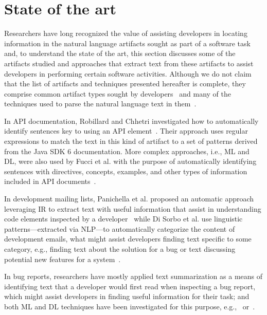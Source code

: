 \section{State of the art}
\label{cp1:novelty}


Researchers have long recognized the value of 
assisting developers in locating information in the natural language artifacts sought as part of a software task
and, to understand the state of the art, this section discusses 
some of the artifacts studied and approaches 
that extract text from these artifacts
to assist developers in performing certain 
software activities.
Although we do not claim that the list of artifacts and techniques presented hereafter is complete,
they comprise common artifact types sought by developers~\cite{umarji2008archetypal, Li2013}
and many of the techniques used to parse the natural language text in them~\cite{arnaoudova2015}.



In API documentation, Robillard and Chhetri investigated how to automatically identify 
sentences key to using an API element~\cite{Robillard2015}.
Their approach uses regular expressions to match the text in this kind of artifact 
to a set of patterns derived from the Java SDK 6 documentation.
More complex approaches, i.e.,  \acf{ML} and \acf{DL},
were also used by Fucci et al.
with the purpose of automatically identifying sentences with 
directives, concepts, examples, and other types of information included in API documents~\cite{fucci2019}.



In development mailing lists, Panichella et al. 
proposed an automatic approach leveraging \acf{IR} to extract 
text with useful information that assist in understanding code elements inspected by a developer~\cite{panichella2012}
while Di Sorbo et al. use linguistic patterns---extracted via \acf{NLP}---to
automatically categorize the content of development emails, what might 
assist developers finding text specific to some category, e.g., 
finding text about the solution for a bug or text discussing potential 
new features for a system~\cite{Sorbo2015}.



In bug reports, researchers have mostly applied text summarization
as a means of identifying text that a developer would first read when inspecting a bug report, 
which might assist developers in finding useful information for their task;
and both \acs{ML} and 
\acs{DL} techniques have been investigated for this purpose, 
e.g.,~\cite{Lotufo2012} or~\cite{li2018deep}.



